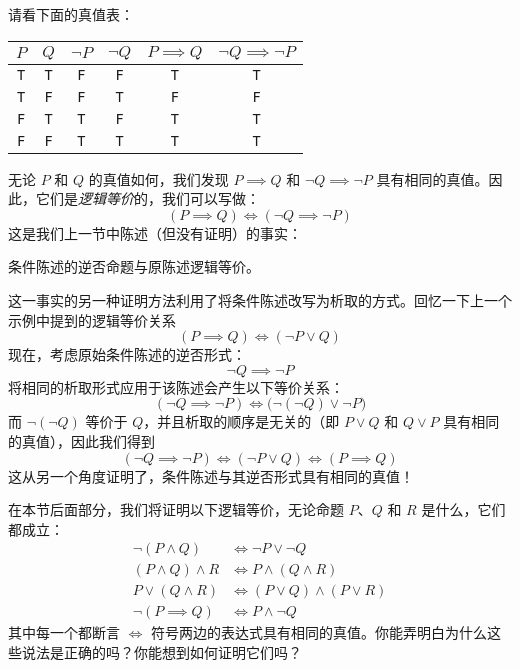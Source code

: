 \begin{example}
    请看下面的真值表：
    \begin{center}
        \begin{tabular}{c|c|c|c|c|c}
              $P$      & $Q$      & $\neg P$ &  $\neg Q$  & $P \implies Q$ & $\neg Q \implies \neg P$ \\
              \hline
              \verb|T| & \verb|T| & \verb|F| &  \verb|F|  &    \verb|T|    &    \verb|T|    \\
              \verb|T| & \verb|F| & \verb|F| &  \verb|T|  &    \verb|F|    &    \verb|F|    \\
              \verb|F| & \verb|T| & \verb|T| &  \verb|F|  &    \verb|T|    &    \verb|T|    \\
              \verb|F| & \verb|F| & \verb|T| &  \verb|T|  &    \verb|T|    &    \verb|T|    \\
        \end{tabular}
    \end{center}
    无论 $P$ 和 $Q$ 的真值如何，我们发现 $P \implies Q$ 和 $\neg Q \implies \neg P$ 具有相同的真值。因此，它们是\emph{逻辑等价}的，我们可以写做：
    \[(P \implies Q) \iff (\neg Q \implies \neg P)\]
    这是我们上一节中陈述（但没有证明）的事实：
    \begin{center}
        条件陈述的逆否命题与原陈述逻辑等价。
    \end{center}

    这一事实的另一种证明方法利用了将条件陈述改写为析取的方式。回忆一下上一个示例中提到的逻辑等价关系
    \[(P \implies Q) \iff (\neg P \lor Q)\]
    现在，考虑原始条件陈述的逆否形式：
    \[\neg Q \implies \neg P\]
    将相同的析取形式应用于该陈述会产生以下等价关系：
    \[(\neg Q \implies \neg P) \iff \big(\neg(\neg Q) \lor \neg P\big)\]
    而 $\neg(\neg Q)$ 等价于 $Q$，并且析取的顺序是无关的（即 $P \lor Q$ 和 $Q \lor P$ 具有相同的真值），因此我们得到
    \[(\neg Q \implies \neg P) \iff (\neg P \lor Q) \iff (P \implies Q)\]
    这从另一个角度证明了，条件陈述与其逆否形式具有相同的真值！
\end{example}

\begin{example}
    在本节后面部分，我们将证明以下逻辑等价，无论命题 $P$、$Q$ 和 $R$ 是什么，它们都成立：
    \begin{align*}
        \neg(P \land Q) &\iff \neg P \lor \neg Q \\
        (P \land Q) \land R &\iff P \land (Q \land R) \\
        P \lor (Q \land R) &\iff (P \lor Q) \land (P \lor R) \\
        \neg (P \implies Q) &\iff P \land \neg Q
    \end{align*}
    其中每一个都断言 $\iff$ 符号两边的表达式具有相同的真值。你能弄明白为什么这些说法是正确的吗？你能想到如何证明它们吗？
\end{example}

